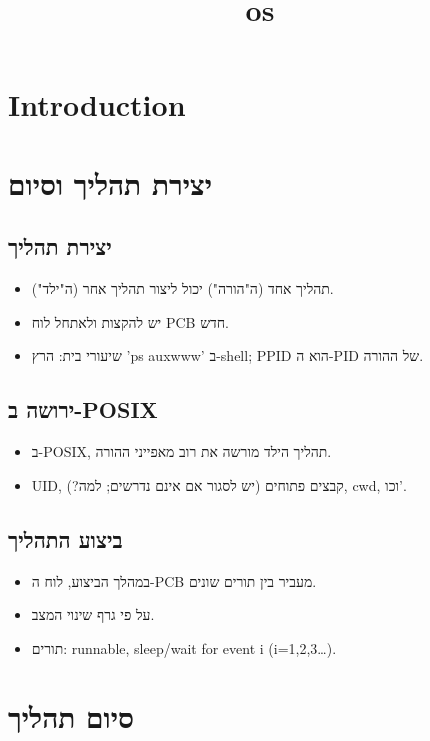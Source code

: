 \documentclass[12pt]{report}
\title{os}
\author{}
\begin{document}
\maketitle
\tableofcontents
\newpage

\section{Introduction}
\section{יצירת תהליך וסיום}

\subsection{יצירת תהליך}

\begin{itemize}
\item תהליך אחד (ה"הורה") יכול ליצור תהליך אחר (ה"ילד").
\item יש להקצות ולאתחל לוח PCB חדש.
\item שיעורי בית: הרץ 'ps auxwww' ב-shell; PPID הוא ה-PID של ההורה.
\end{itemize}

\subsection{ירושה ב-POSIX}

\begin{itemize}
\item ב-POSIX, תהליך הילד מורשה את רוב מאפייני ההורה.
\item UID, קבצים פתוחים (יש לסגור אם אינם נדרשים; למה?), cwd, וכו'.
\end{itemize}

\subsection{ביצוע התהליך}

\begin{itemize}
\item במהלך הביצוע, לוח ה-PCB מעביר בין תורים שונים.
\item על פי גרף שינוי המצב.
\item תורים: runnable, sleep/wait for event i (i=1,2,3…).
\end{itemize}

\section{סיום תהליך}
\end{document}
